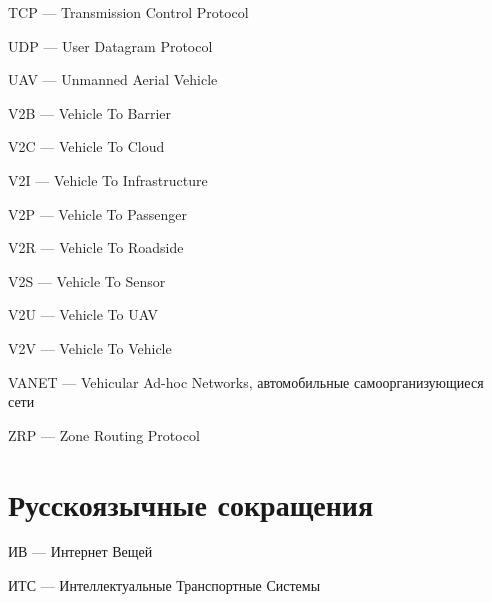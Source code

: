TCP --- Transmission Control Protocol

UDP --- User Datagram Protocol

UAV --- Unmanned Aerial Vehicle

V2B --- Vehicle To Barrier

V2C --- Vehicle To Cloud

V2I --- Vehicle To Infrastructure

V2P --- Vehicle To Passenger

V2R --- Vehicle To Roadside

V2S --- Vehicle To Sensor

V2U --- Vehicle To UAV

V2V --- Vehicle To Vehicle

VANET --- Vehicular Ad-hoc Networks, автомобильные самоорганизующиеся сети

ZRP --- Zone Routing Protocol

\section*{Русскоязычные сокращения}

\mbox{}

ИВ --- Интернет Вещей

ИТС --- Интеллектуальные Транспортные Системы
